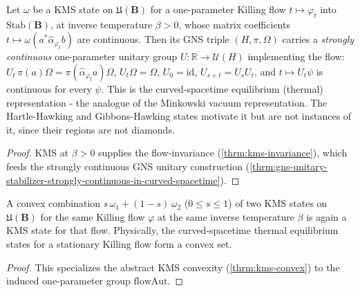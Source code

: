 \begin{theorem}
    \label{thrm:kms-thermal-representation-in-curved-spacetime}
    \leanok
    Let $\omega$ be a KMS state on $\mathfrak{U}(\mathbf{B})$ for a one-parameter Killing flow $t \mapsto \varphi_t$ into $\mathrm{Stab}(\mathbf{B})$, at inverse temperature $\beta > 0$, whose matrix coefficients $t \mapsto \omega(a^* \hat\alpha_{\varphi_t} b)$ are continuous. Then its GNS triple $(H, \pi, \Omega)$ carries a \emph{strongly continuous} one-parameter unitary group $U : \mathbb{R} \to \mathcal{U}(H)$ implementing the flow: $U_t\,\pi(a)\Omega = \pi(\hat\alpha_{\varphi_t} a)\Omega$, $U_t\Omega = \Omega$, $U_0 = \mathrm{id}$, $U_{s+t} = U_s U_t$, and $t \mapsto U_t\psi$ is continuous for every $\psi$. This is the curved-spacetime equilibrium (thermal) representation - the analogue of the Minkowski vacuum representation. The Hartle-Hawking and Gibbons-Hawking states motivate it but are not instances of it, since their regions are not diamonds.
\end{theorem}
\begin{proof}
    \leanok
    KMS at $\beta > 0$ supplies the flow-invariance (\ref{thrm:kms-invariance}), which feeds the strongly continuous GNS unitary construction (\ref{thrm:gns-unitary-stabilizer-strongly-continuous-in-curved-spacetime}).
\end{proof}

\begin{theorem}
    \label{thrm:kms-convex-for-flow-in-curved-spacetime}
    \leanok
    A convex combination $s\,\omega_1 + (1-s)\,\omega_2$ ($0 \le s \le 1$) of two KMS states on $\mathfrak{U}(\mathbf{B})$ for the same Killing flow $\varphi$ at the same inverse temperature $\beta$ is again a KMS state for that flow. Physically, the curved-spacetime thermal equilibrium states for a stationary Killing flow form a convex set.
\end{theorem}
\begin{proof}
    \leanok
    This specializes the abstract KMS convexity (\ref{thrm:kms-convex}) to the induced one-parameter group $\mathrm{flowAut}$.
\end{proof}

